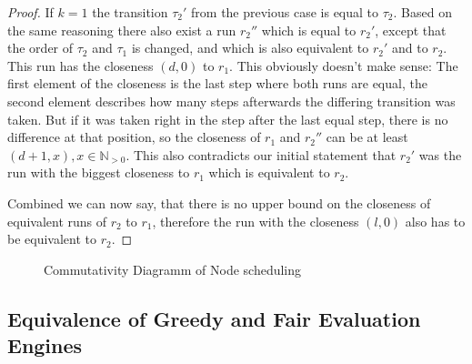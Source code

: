 \begin{proof}
  If \(k = 1\) the transition \(\tau_2'\) from the previous case is equal to \(\tau_2\).
  Based on the same reasoning there also exist a run \(r_2''\) which is equal to \(r_2'\), except that the order of \(\tau_2\) and \(\tau_1\) is changed, and which is also equivalent to \(r_2'\) and to \(r_2\).
  This run has the closeness \((d, 0)\) to \(r_1\).
  This obviously doesn't make sense: The first element of the closeness is the last step where both runs are equal, the second element describes how many steps afterwards the differing transition was taken.
  But if it was taken right in the step after the last equal step, there is no difference at that position, so the closeness of \(r_1\) and \(r_2''\) can be at least \((d+1, x), x \in \mathbb{N}_{>0}\).
  This also contradicts our initial statement that \(r_2'\) was the run with the biggest closeness to \(r_1\) which is equivalent to \(r_2\).

  Combined we can now say, that there is no upper bound on the closeness of equivalent runs of \(r_2\) to \(r_1\), therefore the run with the closeness \((l, 0)\) also has to be equivalent to \(r_2\).

\end{proof}


\begin{figure}
  \caption{Commutativity Diagramm of Node scheduling}
\label{fig:chap5:sec_greedy:commutativity_scheduling}
\end{figure}



\subsection{Equivalence of Greedy and Fair Evaluation Engines}
\label{sec:behaviours:equivalence_without_timing:greedy_fair}

